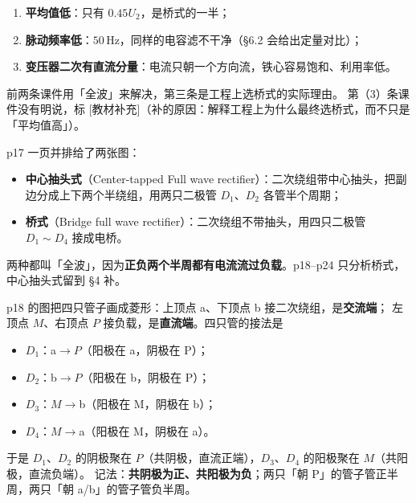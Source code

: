 \documentclass[11pt]{ctexart}
\begin{document}
\begin{enumerate}
\item \textbf{平均值低}：只有 $0.45U_2$，是桥式的一半；
\item \textbf{脉动频率低}：$50\,\mathrm{Hz}$，同样的电容滤不干净（§6.2 会给出定量对比）；
\item \textbf{变压器二次有直流分量}：电流只朝一个方向流，铁心容易饱和、利用率低。
\end{enumerate}
前两条课件用「全波」来解决，第三条是工程上选桥式的实际理由。
第（3）条课件没有明说，标 [教材补充]（补的原因：解释工程上为什么最终选桥式，而不只是「平均值高」）。



p17 一页并排给了两张图：
\begin{itemize}
\item \textbf{中心抽头式}（Center-tapped Full wave rectifier）：二次绕组带中心抽头，把副边分成上下两个半绕组，用两只二极管 $D_1$、$D_2$ 各管半个周期；
\item \textbf{桥式}（Bridge full wave rectifier）：二次绕组不带抽头，用四只二极管 $D_1\sim D_4$ 接成电桥。
\end{itemize}
两种都叫「全波」，因为\textbf{正负两个半周都有电流流过负载}。p18--p24 只分析桥式，中心抽头式留到 §4 补。


p18 的图把四只管子画成菱形：上顶点 a、下顶点 b 接二次绕组，是\textbf{交流端}；
左顶点 $M$、右顶点 $P$ 接负载，是\textbf{直流端}。四只管的接法是
\begin{itemize}
\item $D_1$：a$\to P$（阳极在 a，阴极在 P）；
\item $D_2$：b$\to P$（阳极在 b，阴极在 P）；
\item $D_3$：$M\to$b（阳极在 M，阴极在 b）；
\item $D_4$：$M\to$a（阳极在 M，阴极在 a）。
\end{itemize}
于是 $D_1$、$D_2$ 的阴极聚在 $P$（共阴极，直流正端），$D_3$、$D_4$ 的阳极聚在 $M$（共阳极，直流负端）。
记法：\textbf{共阴极为正、共阳极为负}；两只「朝 P」的管子管正半周，两只「朝 a/b」的管子管负半周。

\end{document}
